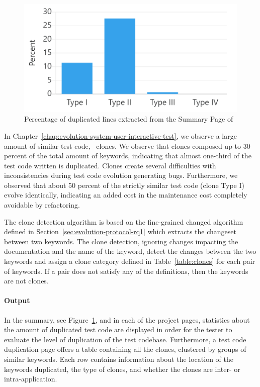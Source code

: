 \begin{figure}[t!]
\centering
\includegraphics[width=0.75\columnwidth]{figures/ikora/clones.png}
\caption{Percentage of duplicated lines extracted from the Summary Page of \tool}
\label{fig:clones}
\end{figure}

In Chapter~\ref{chap:evolution-system-user-interactive-test}, we observe a large amount of similar test code, \ie\ clones. We observe that clones composed up to 30 percent of the total amount of keywords, indicating that almost one-third of the test code written is duplicated. Clones create several difficulties with inconsistencies during test code evolution generating bugs. Furthermore, we observed that about 50 percent of the strictly similar test code (clone Type I) evolve identically, indicating an added cost in the maintenance cost completely avoidable by refactoring.

The clone detection algorithm is based on the fine-grained changed algorithm defined in Section~\ref{sec:evolution-protocol-rq1} which extracts the changeset between two keywords. The clone detection, ignoring changes impacting the documentation and the name of the keyword, detect the changes between the two keywords and assign a clone category defined in Table~\ref{table:clones} for each pair of keywords. If a pair does not satisfy any of the definitions, then the keywords are not clones.

\paragraph{Output} In the summary, see Figure~\ref{fig:clones}, and in each of the project pages, statistics about the amount of duplicated test code are displayed in order for the tester to evaluate the level of duplication of the test codebase. Furthermore, a test code duplication page offers a table containing all the clones, clustered by groups of similar keywords. Each row contains information about the location of the keywords duplicated, the type of clones, and whether the clones are inter- or intra-application.

